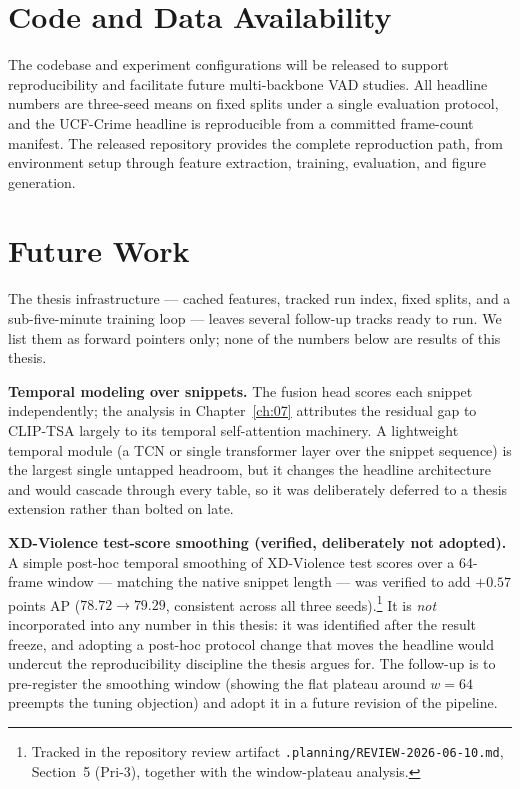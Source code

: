 \section{Code and Data Availability}
\label{sec:conc-code}

The codebase and experiment configurations will be released to support
reproducibility and facilitate future multi-backbone VAD studies. All headline
numbers are three-seed means on fixed splits under a single evaluation
protocol, and the UCF-Crime headline is reproducible from a committed
frame-count manifest. The released repository provides the complete
reproduction path, from environment setup through feature extraction,
training, evaluation, and figure generation.

\section{Future Work}
\label{sec:conc-future}

The thesis infrastructure --- cached features, tracked run index, fixed
splits, and a sub-five-minute training loop --- leaves several follow-up
tracks ready to run. We list them as forward pointers only; none of the
numbers below are results of this thesis.

\textbf{Temporal modeling over snippets.} The fusion head scores each snippet
independently; the analysis in Chapter~\ref{ch:07} attributes the residual gap
to CLIP-TSA largely to its temporal self-attention machinery. A lightweight
temporal module (a TCN or single transformer layer over the snippet sequence)
is the largest single untapped headroom, but it changes the headline
architecture and would cascade through every table, so it was deliberately
deferred to a thesis extension rather than bolted on late.

\textbf{XD-Violence test-score smoothing (verified, deliberately not
adopted).} A simple post-hoc temporal smoothing of XD-Violence test scores
over a 64-frame window --- matching the native snippet length --- was verified
to add $+0.57$ points AP ($78.72 \to 79.29$, consistent across all three
seeds).\footnote{Tracked in the repository review artifact
\texttt{.planning/REVIEW-2026-06-10.md}, Section~5 (Pri-3), together with the
window-plateau analysis.} It is \emph{not} incorporated into any number in
this thesis: it was identified after the result freeze, and adopting a
post-hoc protocol change that moves the headline would undercut the
reproducibility discipline the thesis argues for. The follow-up is to
pre-register the smoothing window (showing the flat plateau around $w=64$
preempts the tuning objection) and adopt it in a future revision of the
pipeline.

